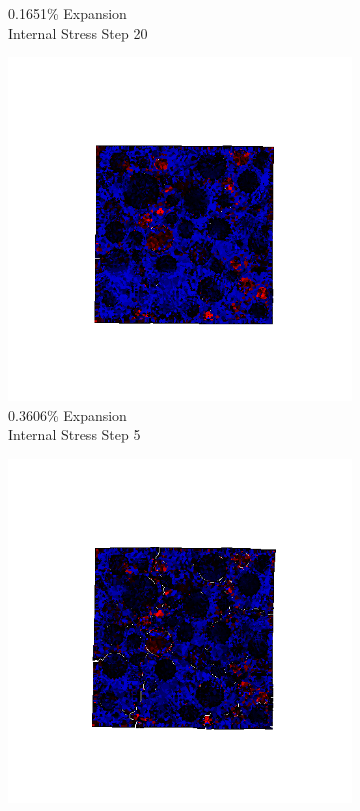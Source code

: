 \begin{figure}[ht!]
\begin{subfigure}{.25\textwidth}
      \caption{0.1651\% Expansion\\Internal Stress Step 20}
    \end{subfigure}

    \begin{subfigure}{.25\textwidth}
      \centering
      \includegraphics[width=1.0\linewidth]{Files/exp_3D/ASR/A30P25_2_s5.png}
      \caption{0.3606\% Expansion\\Internal Stress Step 5}
    \end{subfigure}%
    \begin{subfigure}{.25\textwidth}
      \centering
      \includegraphics[width=1.0\linewidth]{Files/exp_3D/ASR/A30P25_2_s10.png}

\end{subfigure}
\end{figure}
